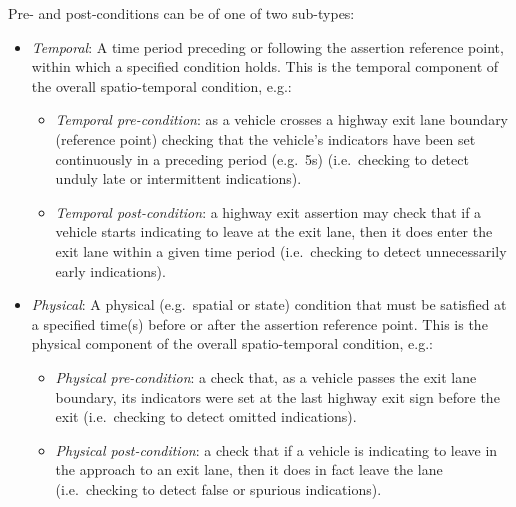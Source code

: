 Pre- and post-conditions can be of one of two sub-types:
\begin{itemize}
	\item \textit{Temporal}: A time period preceding or following the assertion reference point, within which a specified condition holds. This is the temporal component of the overall spatio-temporal condition, e.g.:%
	\begin{itemize}
		\item \textit{Temporal pre-condition}: as a vehicle crosses a highway exit lane boundary (reference point) checking that the vehicle's indicators have been set continuously in a preceding period (e.g.\ 5s) (i.e.\ checking to detect unduly late or intermittent indications).
		\item\textit{Temporal post-condition}: a highway exit assertion may check that if a vehicle starts indicating to leave at the exit lane, then it does enter the exit lane within a given time period (i.e.\ checking to detect unnecessarily early indications).
	\end{itemize}
	
	\item \textit{Physical}: A physical (e.g.\ spatial or state) condition that must be satisfied at a specified time(s) before or after the assertion reference point. This is the physical component of the overall spatio-temporal condition, e.g.:%
	\begin{itemize}
		\item \textit{Physical pre-condition}: a check that, as a vehicle passes the exit lane boundary, its indicators were set at the last highway exit sign before the exit (i.e.\ checking to detect omitted indications).
		\item \textit{Physical post-condition}: a check that if a vehicle is indicating to leave in the approach to an exit lane, then it does in fact leave the lane (i.e.\ checking to detect false or spurious indications).
	\end{itemize} 
\end{itemize}

